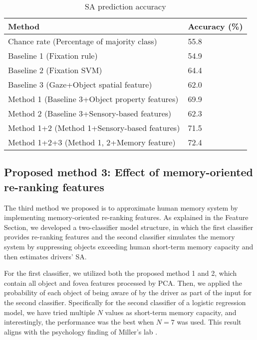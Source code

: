 \documentclass[letterpaper, 10 pt, conference]{ieeeconf}  %
\begin{document}
\begin{table}[t]
\caption{SA prediction accuracy}
    \begin{center}
        \begin{tabular}{m{60mm}P{16mm}}
        \hline 
        \centering Method & Accuracy (\%) \\ \hline
        Chance rate (Percentage of majority class) & 55.8 \\ \hline
        Baseline 1 (Fixation rule) & 54.9 \\ \hline
        Baseline 2 (Fixation SVM)  & 64.4 \\ \hline
        Baseline 3 (Gaze+Object spatial feature)  & 62.0 \\ \hline
        Method 1 (Baseline 3+Object property features) & 69.9 \\ \hline
        Method 2 (Baseline 3+Sensory-based features)   & 62.3 \\ \hline
        Method 1+2 (Method 1+Sensory-based features) & 71.5 \\ \hline
        Method 1+2+3 (Method 1, 2+Memory feature)    & 72.4 \\
        \hline
        \end{tabular}
    \end{center}
\label{tab:SA_accuracy}
\vspace{-3mm}
\end{table}

\subsection{Proposed method 3: Effect of memory-oriented re-ranking features}

The third method we proposed is to approximate human memory system by implementing memory-oriented re-ranking features. As explained in the Feature Section, we developed a two-classifier model structure, in which the first classifier provides re-ranking features and the second classifier simulates the memory system by suppressing objects exceeding human short-term memory capacity and then estimates drivers' SA.

For the first classifier, we utilized both the proposed method 1 and 2, which contain all object and fovea features processed by PCA. Then, we applied the probability of each object of being aware of by the driver as part of the input for the second classifier. Specifically for the second classifier of a logistic regression model, we have tried multiple $N$ values as short-term memory capacity, and interestingly, the performance was the best when $N=7$ was used. This result aligns with the psychology finding of Miller's lab \cite{miller1956magical}.
\end{document}
